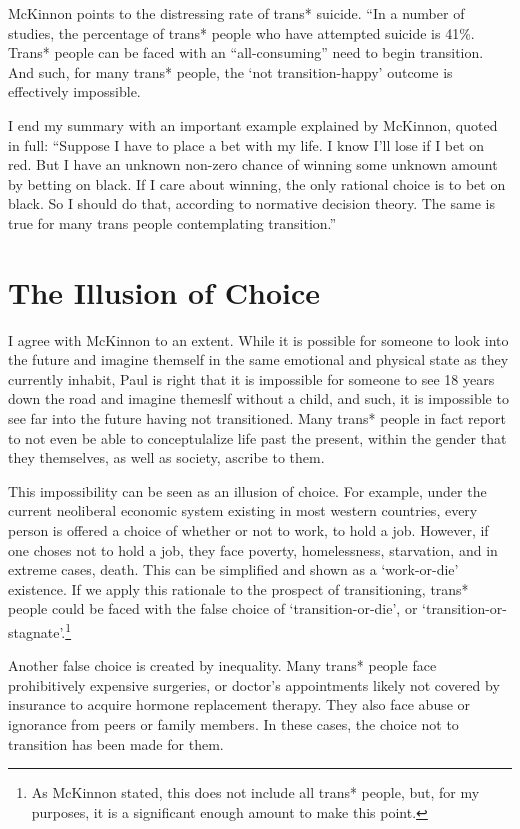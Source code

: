 \documentclass[12pt]{article}
\begin{document}
McKinnon points to the distressing rate of trans* suicide. ``In a number of studies, the percentage
of trans* people who have attempted suicide is 41\%. Trans* people can be faced with an
``all-consuming'' need to begin transition. And such, for many trans* people, the `not
transition-happy' outcome is effectively impossible.

I end my summary with an important example explained by McKinnon, quoted in full: ``Suppose I have
to place a bet with my life. I know I’ll lose if I bet on red. But I have an unknown non-zero chance
of winning some unknown amount by betting on black. If I care about winning, the only rational
choice is to bet on black. So I should do that, according to normative decision theory. The same is
true for many trans people contemplating transition.''

\section{The Illusion of Choice}

I agree with McKinnon to an extent. While it is possible for someone to look into the future and
imagine themself in the same emotional and physical state as they currently inhabit, Paul is right
that it is impossible for someone to see 18 years down the road and imagine themeslf without a
child, and such, it is impossible to see far into the future having not transitioned. Many trans*
people in fact report to not even be able to conceptulalize life past the present, within the gender
that they themselves, as well as society, ascribe to them. 

This impossibility can be seen as an illusion of choice. For example, under the current neoliberal
economic system existing in most western countries, every person is offered a choice of whether or
not to work, to hold a job. However, if one choses not to hold a job, they face poverty,
homelessness, starvation, and in extreme cases, death. This can be simplified and shown as a
`work-or-die' existence. If we apply this rationale to the prospect of transitioning, trans* people
could be faced with the false choice of `transition-or-die', or
`transition-or-stagnate'.\footnote{As McKinnon stated, this does not include all trans* people, but,
for my purposes, it is a significant enough amount to make this point.}

Another false choice is created by inequality. Many trans* people face prohibitively expensive
surgeries, or doctor's appointments likely not covered by insurance to acquire hormone replacement
therapy. They also face abuse or ignorance from peers or family members. In these cases, the choice
not to transition has been made for them. 
\end{document}
